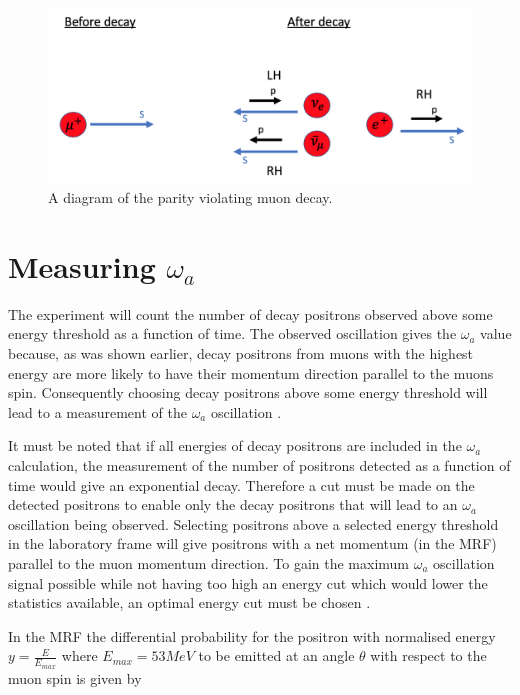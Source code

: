 \begin{figure}[th]
\centering
\includegraphics[scale=0.55]{Figures/muondecay.png}
\decoRule
\caption{A diagram of the parity violating muon decay.}
\label{fig:muondecay}
\end{figure}

\section{Measuring $\omega_{a}$}

The experiment will count the number of decay positrons observed above some energy threshold as a function of time. The observed oscillation gives the $\omega_{a}$ value because, as was shown earlier, decay positrons from muons with the highest energy are more likely to have their momentum direction parallel to the muons spin. Consequently choosing decay positrons above some energy threshold will lead to a measurement of the $\omega_{a}$ oscillation \cite{Reference29}.

It must be noted that if all energies of decay positrons are included in the $\omega_{a}$ calculation, the measurement of the number of positrons detected as a function of time would give an exponential decay. Therefore a cut must be made on the detected positrons to enable only the decay positrons that will lead to an $\omega_{a}$ oscillation being observed. Selecting positrons above a selected energy threshold in the laboratory frame will give positrons with a net momentum (in the MRF) parallel to the muon momentum direction. To gain the maximum $\omega_{a}$ oscillation signal possible while not having too high an energy cut which would lower the statistics available, an optimal energy cut must be chosen \cite{Reference1}\cite{Reference13}.

In the MRF the differential probability for the positron with normalised energy $y=\frac{E}{E_{max}}$ where $E_{max}=53MeV$ to be emitted at an angle $\theta$ with respect to the muon spin is given by

